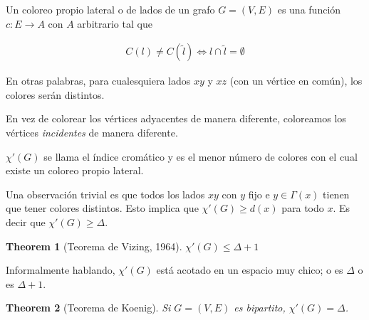 \documentclass[a4paper]{article}
\newtheorem{theorem}{Theorem}
\newtheorem{theorem}{Theorem}
\begin{document}
\normalsize

\begin{definition}
    Un coloreo propio lateral o de lados de un grafo $G = (V, E) $ es una
    función $c : E \to A$ con $A$ arbitrario tal que 

    \begin{align*}
        C(l) \neq C(\widetilde{l}) \iff l \cap \widetilde{l} = \emptyset
    \end{align*}

    En otras palabras, para cualesquiera lados $xy$ y $xz$ (con un vértice en común), 
    los colores serán distintos.
\end{definition}

En vez de colorear los vértices adyacentes de manera diferente, coloreamos los
vértices \textit{incidentes} de manera diferente.

\begin{definition}
    $\chi'(G)$ se llama el índice cromático y es el menor número de colores con el cual 
    existe un coloreo propio lateral.
\end{definition}

Una observación trivial es que todos los lados $xy$ con $y$ fijo e $y \in
\Gamma(x)$ tienen que tener colores distintos. Esto implica que $\chi'(G) \geq
d(x)$ para todo $x$. Es decir que $\chi'(G) \geq \Delta$.

\begin{theorem}[Teorema de Vizing, 1964]
    $\chi'(G) \leq \Delta + 1$
\end{theorem}

Informalmente hablando, $\chi'(G)$ está acotado en un espacio muy chico; o es
$\Delta$ o es $\Delta + 1$.

\begin{theorem}[Teorema de Koenig]
    Si $G = (V, E) $ es bipartito, $\chi'(G) = \Delta$.
\end{theorem}
\end{document}
